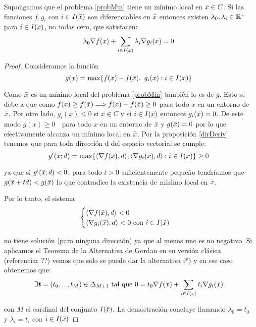 		\begin{teoremaBox}\label{FritzJohn}
			Supongamos que el problema \ref{probMin} tiene un mínimo local en $ \bar{x} \in C $. Si las funciones $ f, g_i $ con $ i \in I(\bar{x}) $ son diferenciables en $ \bar{x} $ entonces existen $ \lambda_0, \lambda_i \in \mathbb{R}^+ $ para $ i \in I(\bar{x}) $, no todas cero, que satisfacen:
			\[
			\lambda_0 \nabla f(\bar{x}) + \sum_{i \in I(\bar{x})} \lambda_i \nabla g_i(\bar{x}) = 0
			\]
		\end{teoremaBox}
		\begin{proof}
			Consideramos la función 
			\[
			g(x) = \max \{ f(x) - f(\bar{x}),\text{ } g_i(x) : i \in I(\bar{x})\}
			\]
			
			Como $ \bar{x} $ es un mínimo local del problema \ref{probMin} también lo es de $ g $. Esto se debe a que como $ f(x) \geq f(\bar{x}) \Longrightarrow  f(x) - f(\bar{x}) \geq 0$ para todo $ x $ en un entorno de $ \bar{x} $. Por otro lado, $ g_i(x) \leq 0 $ si $ x \in C $ y si $ i \in I(\bar{x}) $ entonces $ g_i(\bar{x})=0 $. De este modo $ g(x) \geq 0 \text{ } $ para todo $ x $ en un entorno de $ \bar{x} $ y $ g(\bar{x}) = 0 $ por lo que efectivamente alcanza un mínimo local en $ \bar{x} $. Por la proposición \ref{dirDeriv} tenemos que para toda dirección d del espacio vectorial se cumple:
			\[
			g'(\bar{x};d) = \max \{ \langle \nabla f(\bar{x}), d\rangle , \langle \nabla g_i(\bar{x}),d \rangle : i \in I(\bar{x})\} \geq 0
			\]
			
			ya que si $ g'(\bar{x};d) < 0 $, para todo $ t > 0 $ suficientemente pequeño tendríamos que $ g(\bar{x} + td) < g(\bar{x}) $ lo que contradice la existencia de mínimo local en $ \bar{x} $.
			
			Por lo tanto, el sistema 
			\begin{equation*}
			\begin{cases}
			\langle \nabla f(\bar{x}), d\rangle  < 0 \\
			\langle \nabla g_i(\bar{x}),d \rangle < 0\text{ con } i \in I(\bar{x})
			\end{cases}
			\end{equation*}
			
			no tiene solución (para ninguna dirección) ya que al menos uno es no negativo. Si aplicamos el Teorema de la Alternativa de Gordan en su versión clásica (referenciar ??) vemos que solo se puede dar la alternativa i*) y en ese caso obtenemos que:
			\[
			 \exists \textbf{\emph{t}} = (t_0, ..., t_{M})\in \Delta_{M+1}  \text{ tal que }0 = t_0 \nabla f(\bar{x}) + \sum_{i \in I(\bar{x})}  t_i \nabla g_i (\bar{x})
			 \]
			 
			con $ M $ el cardinal del conjunto $ I(\bar{x}) $. La demostración concluye llamando $ \lambda_0 = t_0 $ y $ \lambda_i = t_i $ con $ i \in I(\bar{x}) $
		\end{proof}
	
